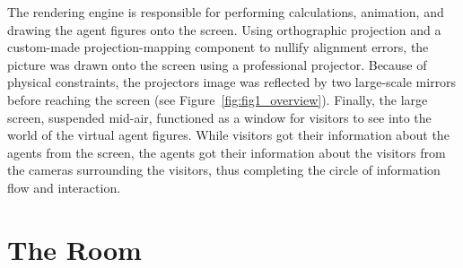 \documentclass[draft,final]{vutinfth} %
\begin{document}
The rendering engine is responsible for performing calculations, animation, and drawing the agent figures onto the screen. 
Using orthographic projection and a custom-made projection-mapping component to nullify alignment errors, the picture was drawn onto the screen using a professional projector. 
Because of physical constraints, the projectors image was reflected by two large-scale mirrors before reaching the screen (see Figure~\ref{fig:fig1_overview}). 
Finally, the large screen, suspended mid-air, functioned as a window for visitors to see into the world of the virtual agent figures. 
While visitors got their information about the agents from the screen, the agents got their information about the visitors from the cameras surrounding the visitors, thus completing the circle of information flow and interaction.

\section{The Room}
\label{chap:theroom}
\end{document}
